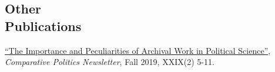 \documentclass[margin,line,10.95pt]{res}
\begin{document}
\begin{resume}









\section{\sc Other \\ Publications}

\href{https://www.comparativepoliticsnewsletter.org/wp-content/uploads/2019/12/CP-Newsletter-Fall-19-CP-and-History.pdf}{``The Importance and Peculiarities of Archival Work in Political Science''}, \emph{Comparative Politics Newsletter}, Fall 2019, XXIX(2) 5-11.









\end{resume}
\end{document}
